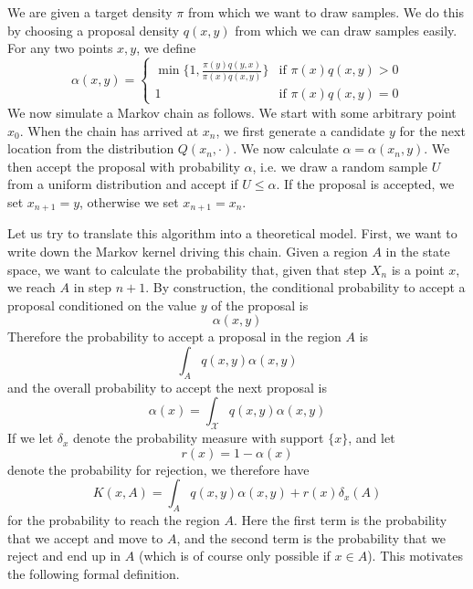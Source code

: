 \documentclass[a4paper, draft]{article}
\theoremstyle{own}
\theoremstyle{remark}
\begin{document}
We are given a target density $\pi$ from which we want to draw samples. We do this by choosing a proposal density $q(x,y)$ from which we can draw samples easily. For any two points $x,y$, we define
$$
\alpha(x,y) = 
\begin{cases}
\min \{ 1, \frac{\pi(y)q(y,x)}{\pi(x)q(x,y)} \} & \text{if } \pi(x) q(x,y) > 0 \\
1 & \text{if } \pi(x) q(x,y) = 0 
\end{cases}
$$
We now simulate a Markov chain as follows. We start with some arbitrary point $x_0$. When the chain 
has arrived at $x_n$, we first generate a candidate $y$ for the next location from the 
distribution $Q(x_n, \cdot)$. We now calculate $\alpha = \alpha(x_n, y)$. We then accept the proposal with probability $\alpha$, i.e. we draw a random sample $U$ from a uniform distribution
and accept if $U \leq \alpha$. If the proposal is accepted, we set $x_{n+1} = y$, otherwise we set
$x_{n+1} = x_n$.

Let us try to translate this algorithm into a theoretical model. First, we want to write down the Markov kernel driving this chain.
Given a region $A$ in the state space, we want to calculate the probability that, given that step $X_n$ is a point $x$, we reach $A$ in step $n+1$. By construction, the conditional probability to accept a proposal conditioned on the value $y$ of the proposal is
$$
\alpha(x,y)
$$
Therefore the probability to accept a proposal in the region $A$ is
$$
\int_A q(x,y) \alpha(x,y)
$$
and the overall probability to accept the next proposal is
$$
\alpha(x) = \int_{\mathcal X} q(x,y) \alpha(x,y)
$$
If we let $\delta_x$ denote the probability measure with support $\{ x \}$, and let
$$
r(x) = 1 - \alpha(x)
$$
denote the probability for rejection, we therefore have
$$
K(x,A) = \int_A q(x,y) \alpha(x,y) + r(x) \delta_x(A)
$$
for the probability to reach the region $A$. Here the first term is the probability that we accept and move to $A$, and the second term is the probability that we reject and end up in $A$ (which is of course only possible if $x \in A$). This motivates the following formal definition.
\end{document}
